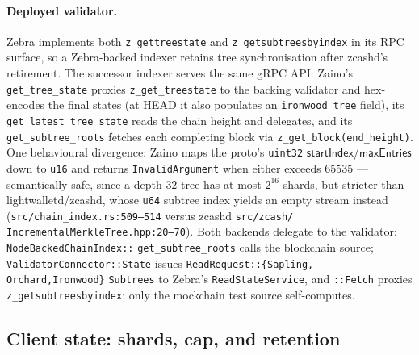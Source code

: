 \documentclass[11pt,a4paper]{article}
\theoremstyle{definition}
\begin{document}
\paragraph{Deployed validator.} Zebra implements both
\texttt{z\_gettreestate} and \texttt{z\_getsubtreesbyindex} in its RPC
surface, so a Zebra-backed indexer retains tree synchronisation after
zcashd's retirement. The
successor indexer serves the same gRPC API: Zaino's
\texttt{get\_tree\_state} proxies \texttt{z\_get\_treestate} to the
backing validator and hex-encodes the final states (at HEAD it also
populates an \texttt{ironwood\_tree} field), its
\texttt{get\_latest\_tree\_state} reads the chain height and delegates,
and its \texttt{get\_subtree\_roots} fetches each completing block via
\texttt{z\_get\_block(end\_height)}. One behavioural
divergence: Zaino maps the proto's \texttt{uint32}
$\mathsf{startIndex}$/$\mathsf{maxEntries}$ down to \texttt{u16} and
returns \texttt{InvalidArgument} when either exceeds $65535$ ---
semantically safe, since a depth-$32$ tree has at most $2^{16}$ shards,
but stricter than \textsf{lightwalletd}/\textsf{zcashd}, whose
\texttt{u64} subtree index yields an empty stream instead
(\texttt{src/chain\_index.rs:509--514} versus
\textsf{zcashd} \texttt{src/zcash/}\allowbreak
\texttt{IncrementalMerkleTree.hpp:20--70}).
Both backends delegate to the validator:
\texttt{NodeBackedChainIndex::}\allowbreak%
\texttt{get\_subtree\_\allowbreak roots}
calls the blockchain
source;
\texttt{Validator\allowbreak Connector::\allowbreak State} issues
\texttt{ReadRequest::}\allowbreak\texttt{\{Sapling,}\allowbreak%
\texttt{Orchard,}\allowbreak\texttt{Ironwood\}}\allowbreak%
\texttt{Subtrees} to Zebra's
\texttt{ReadState\allowbreak Service}, and \texttt{::Fetch} proxies
\texttt{z\_get}\allowbreak\texttt{subtrees}\allowbreak\texttt{byindex}; only
the mockchain test source self-computes.

\subsection{Client state: shards, cap, and retention}
\label{sec:sync-tree-store}
\end{document}

